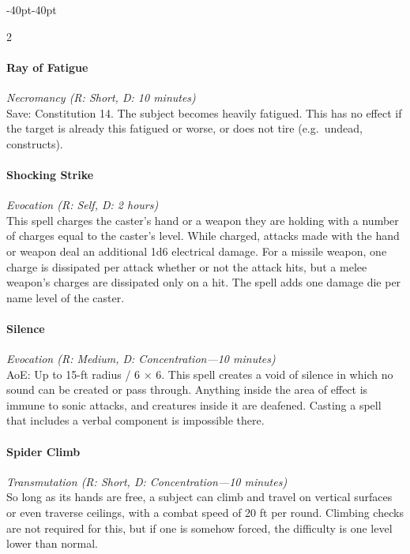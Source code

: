 \documentclass{book}
\begin{document}
\begin{adjustwidth}{-40pt}{-40pt}
\begin{multicols}{2}
\paragraph{Ray of Fatigue}\label{ray-of-fatigue}

\emph{Necromancy (R: Short, D: 10 minutes)}\\
Save: Constitution 14. The subject becomes heavily fatigued. This has no
effect if the target is already this fatigued or worse, or does not tire
(e.g.~undead, constructs).

\paragraph{Shocking Strike}\label{shocking-strike}

\emph{Evocation (R: Self, D: 2 hours)}\\
This spell charges the caster's hand or a weapon they are holding with a
number of charges equal to the caster's level. While charged, attacks
made with the hand or weapon deal an additional 1d6 electrical damage.
For a missile weapon, one charge is dissipated per attack whether or not
the attack hits, but a melee weapon's charges are dissipated only on a
hit. The spell adds one damage die per name level of the caster.

\paragraph{Silence}\label{silence}

\emph{Evocation (R: Medium, D: Concentration---10 minutes)}\\
AoE: Up to 15-ft radius / 6 × 6. This spell creates a void of silence in
which no sound can be created or pass through. Anything inside the area
of effect is immune to sonic attacks, and creatures inside it are
deafened. Casting a spell that includes a verbal component is impossible
there.

\paragraph{Spider Climb}\label{spider-climb}

\emph{Transmutation (R: Short, D: Concentration---10 minutes)}\\
So long as its hands are free, a subject can climb and travel on
vertical surfaces or even traverse ceilings, with a combat speed of 20
ft per round. Climbing checks are not required for this, but if one is
somehow forced, the difficulty is one level lower than normal.


\end{multicols}
\end{adjustwidth}
\end{document}
